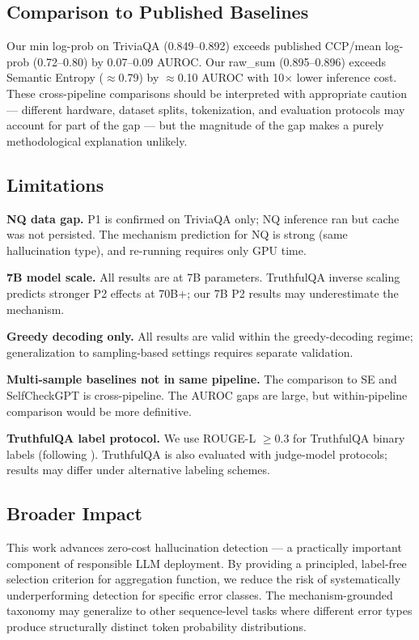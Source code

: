 \subsection{Comparison to Published Baselines}

Our min log-prob on TriviaQA (0.849--0.892) exceeds published CCP/mean log-prob (0.72--0.80) by 0.07--0.09 AUROC. Our raw\_sum (0.895--0.896) exceeds Semantic Entropy ($\approx$0.79) by $\approx$0.10 AUROC with 10$\times$ lower inference cost. These cross-pipeline comparisons should be interpreted with appropriate caution --- different hardware, dataset splits, tokenization, and evaluation protocols may account for part of the gap --- but the magnitude of the gap makes a purely methodological explanation unlikely.

\subsection{Limitations}

\textbf{NQ data gap.} P1 is confirmed on TriviaQA only; NQ inference ran but cache was not persisted. The mechanism prediction for NQ is strong (same hallucination type), and re-running requires only GPU time.

\textbf{7B model scale.} All results are at 7B parameters. TruthfulQA inverse scaling \citep{lin2022} predicts stronger P2 effects at 70B+; our 7B P2 results may underestimate the mechanism.

\textbf{Greedy decoding only.} All results are valid within the greedy-decoding regime; generalization to sampling-based settings requires separate validation.

\textbf{Multi-sample baselines not in same pipeline.} The comparison to SE and SelfCheckGPT is cross-pipeline. The AUROC gaps are large, but within-pipeline comparison would be more definitive.

\textbf{TruthfulQA label protocol.} We use ROUGE-L $\geq 0.3$ for TruthfulQA binary labels (following \citet{fadeeva2024}). TruthfulQA is also evaluated with judge-model protocols; results may differ under alternative labeling schemes.

\subsection{Broader Impact}

This work advances zero-cost hallucination detection --- a practically important component of responsible LLM deployment. By providing a principled, label-free selection criterion for aggregation function, we reduce the risk of systematically underperforming detection for specific error classes. The mechanism-grounded taxonomy may generalize to other sequence-level tasks where different error types produce structurally distinct token probability distributions.
